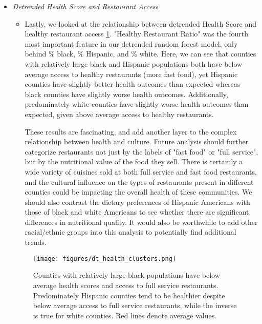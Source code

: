 \documentclass{article}
\begin{document}
\begin{itemize}[leftmargin=0pt]
\begin{itemize}
\item[] \textit{Detrended Health Score and Restaurant Access}
\begin{itemize}
    \item[] Lastly, we looked at the relationship between detrended Health Score and healthy restaurant access \ref{fig:detrend_health_clusters}. "Healthy Restaurant Ratio" was the fourth most important feature in our detrended random forest model, only behind \% black, \% Hispanic, and \% white. Here, we can see that counties with relatively large black and Hispanic populations both have below average access to healthy restaurants (more fast food), yet Hispanic counties have slightly better health outcomes than expected whereas black counties have slightly worse health outcomes. Additionally, predominately white counties have slightly worse health outcomes than expected, given above average access to healthy restaurants.

    These results are fascinating, and add another layer to the complex relationship between health and culture. Future analysis should further categorize restaurants not just by the labels of "fast food" or "full service", but by the nutritional value of the food they sell. There is certainly a wide variety of cuisines sold at both full service and fast food restaurants, and the cultural influence on the types of restaurants present in different counties could be impacting the overall health of these communities. We should also contrast the dietary preferences of Hispanic Americans with those of black and white Americans to see whether there are significant differences in nutritional quality. It would also be worthwhile to add other racial/ethnic groups into this analysis to potentially find additional trends. 
\end{itemize}
\begin{figure}[h!]
    \centering
    \texttt{[image: figures/dt\_health\_clusters.png]}
    \caption{Counties with relatively large black populations have below average health scores and access to full service restaurants. Predominately Hispanic counties tend to be healthier despite below average access to full service restaurants, while the inverse is true for white counties. Red lines denote average values.}
    \label{fig:detrend_health_clusters}
\end{figure}
\end{itemize}


\end{itemize}
\end{document}
